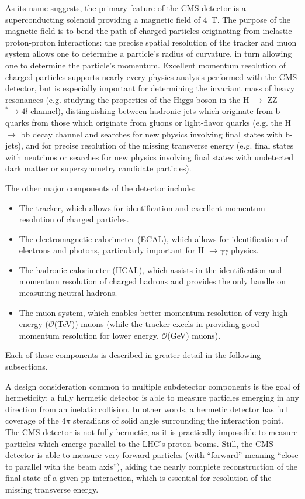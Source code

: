 As its name suggests, the primary feature of the CMS detector is a superconducting solenoid providing a magnetic field of 4~T.
The purpose of the magnetic field is to bend the path of charged particles originating from inelastic proton-proton interactions: the precise spatial resolution of the tracker and muon system allows one to determine a particle's radius of curvature, in turn allowing one to determine the particle's momentum.
Excellent momentum resolution of charged particles supports nearly every physics analysis performed with the CMS detector, but is especially important for determining the invariant mass of heavy resonances (e.g. studying the properties of the Higgs boson in the H $\to$ ZZ$^{*} \to 4l$ channel), distinguishing between hadronic jets which originate from b quarks from those which originate from gluons or light-flavor quarks (e.g. the H $\to$ bb decay channel and searches for new physics involving final states with b-jets), and for precise resolution of the missing transverse energy (e.g. final states with neutrinos or searches for new physics involving final states with undetected dark matter or supersymmetry candidate particles).

The other major components of the detector include: 
\begin{itemize}
    \item The tracker, which allows for identification and excellent momentum resolution of charged particles.
    \item The electromagnetic calorimeter (ECAL), which allows for identification of electrons and photons, particularly important for H $\to \gamma \gamma$ physics.
    \item The hadronic calorimeter (HCAL), which assists in the identification and momentum resolution of charged hadrons and provides the only handle on measuring neutral hadrons.
    \item The muon system, which enables better momentum resolution of very high energy ($\mathcal O$(TeV)) muons (while the tracker excels in providing good momentum resolution for lower energy, $\mathcal O$(GeV) muons).
\end{itemize}
Each of these components is described in greater detail in the following subsections.

A design consideration common to multiple subdetector components is the goal of hermeticity: a fully hermetic detector is able to measure particles emerging in any direction from an inelatic collision.
In other words, a hermetic detector has full coverage of the $4\pi$ steradians of solid angle surrounding the interaction point.
The CMS detector is not fully hermetic, as it is practically impossible to measure particles which emerge parallel to the LHC's proton beams.
Still, the CMS detector is able to measure very forward particles (with ``forward'' meaning ``close to parallel with the beam axis''), aiding the nearly complete reconstruction of the final state of a given pp interaction, which is essential for resolution of the missing transverse energy.

